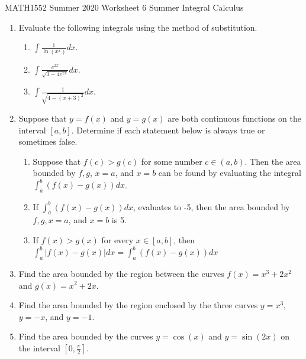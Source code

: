 \documentclass[12pt]{article}
\begin{document}
\noindent
MATH1552 Summer 2020
\hspace{2.2cm}
Worksheet 6 Summer
\hspace{2cm} Integral Calculus

\vspace{2mm}


\begin{enumerate}

\item Evaluate the following integrals using the method of substitution.



\begin{enumerate}
\item $\int \frac{1}{\ln(x^x)}dx$.

\item $\int \frac{e^{2x}}{\sqrt{3-4e^{2x}}}dx$.

\item $\int \frac{1}{\sqrt{4-(x+3)^2}}dx$.
\end{enumerate}

\item Suppose that $y = f(x)$ and $y = g(x)$ are both continuous functions on the interval $[a ,b]$.
Determine if each statement below is always true or sometimes false.

\begin{enumerate}
\item Suppose that $f(c) > g(c)$ for some number $c\in (a, b)$. Then the area bounded by $f, g$,
$x = a$, and $x = b$ can be found by evaluating the integral $\int_a^b (f(x)-g(x))dx$.

\item If $\int_a^b (f(x)-g(x))dx$,  evaluates to -5, then the area bounded by $f, g, x = a$, and $x = b$
is 5.

\item  If $f(x) > g(x)$ for every $x \in [a, b]$, then $\int_a^b |f(x)-g(x)|dx =\int_a^b (f(x)-g(x))dx$

\end{enumerate}

\item Find the area bounded by the region between the curves $f(x) = x^3 + 2x^2$ and $g(x) =
x^2 + 2x$.


\item Find the area bounded by the region enclosed by the three curves $y = x^3$, $y = -x$, and
$y = -1$.

\item Find the area bounded by the curves $y = \cos(x)$ and $y = \sin(2x)$ on the interval $[0,\frac{\pi}{2}]$.



\end{enumerate}
\end{document}
